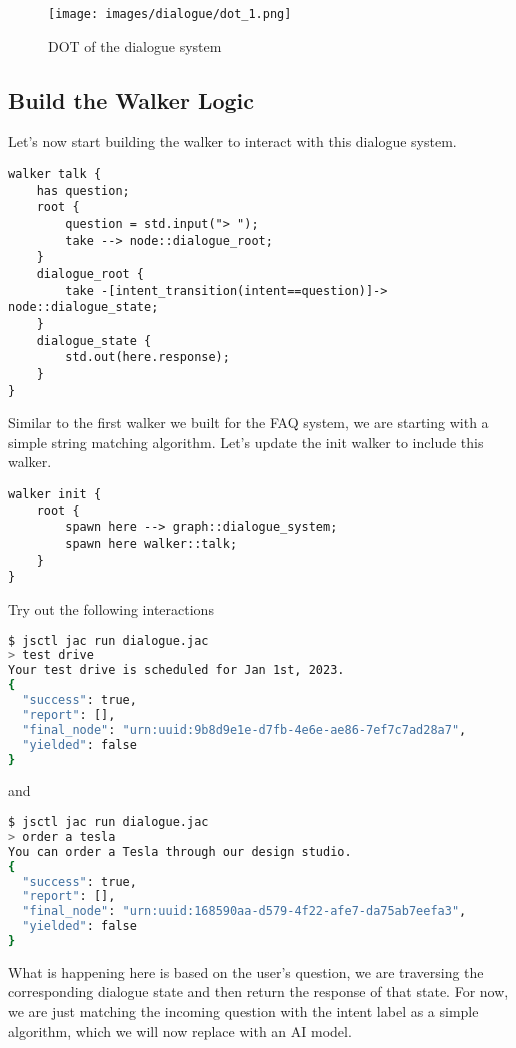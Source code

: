 \begin{figure}
\centering
\texttt{[image: images/dialogue/dot\_1.png]}
\caption{DOT of the dialogue system}
\end{figure}

\hypertarget{build-the-walker-logic}{%
\subsection{Build the Walker Logic}\label{build-the-walker-logic}}

Let's now start building the walker to interact with this dialogue
system.

\begin{lstlisting}
walker talk {
    has question;
    root {
        question = std.input("> ");
        take --> node::dialogue_root;
    }
    dialogue_root {
        take -[intent_transition(intent==question)]-> node::dialogue_state;
    }
    dialogue_state {
        std.out(here.response);
    }
}
\end{lstlisting}

Similar to the first walker we built for the FAQ system, we are starting
with a simple string matching algorithm. Let's update the init walker to
include this walker.

\begin{lstlisting}
walker init {
    root {
        spawn here --> graph::dialogue_system;
        spawn here walker::talk;
    }
}
\end{lstlisting}

Try out the following interactions

\begin{lstlisting}[language=bash]
$ jsctl jac run dialogue.jac
> test drive
Your test drive is scheduled for Jan 1st, 2023.
{
  "success": true,
  "report": [],
  "final_node": "urn:uuid:9b8d9e1e-d7fb-4e6e-ae86-7ef7c7ad28a7",
  "yielded": false
}
\end{lstlisting}

and

\begin{lstlisting}[language=bash]
$ jsctl jac run dialogue.jac
> order a tesla
You can order a Tesla through our design studio.
{
  "success": true,
  "report": [],
  "final_node": "urn:uuid:168590aa-d579-4f22-afe7-da75ab7eefa3",
  "yielded": false
}
\end{lstlisting}

What is happening here is based on the user's question, we are
traversing the corresponding dialogue state and then return the response
of that state. For now, we are just matching the incoming question with
the intent label as a simple algorithm, which we will now replace with
an AI model.

